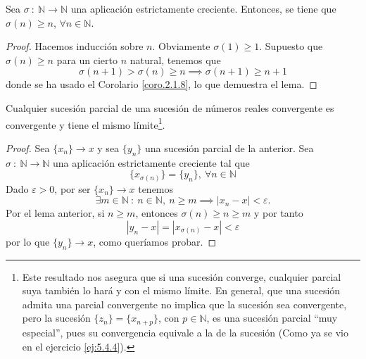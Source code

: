 \begin{lema}
    Sea $\sigma ~:~ \mathbb{N} \longrightarrow \mathbb{N}$ una aplicación estrictamente creciente. Entonces, se tiene que $\sigma(n) \geq n$, $\forall n \in \mathbb{N}$.
\end{lema}
\begin{proof}
    Hacemos inducción sobre $n$. Obviamente $\sigma(1) \geq 1$. Supuesto que $\sigma(n) \geq n$ para un cierto $n$ natural, tenemos que
    \begin{equation*}
        \sigma(n+1) > \sigma(n) \geq n \implies \sigma(n+1) \geq n+1
    \end{equation*}
    donde se ha usado el Corolario \ref{coro.2.1.8}, lo que demuestra el lema.
\end{proof}

\begin{prop}
    Cualquier sucesión parcial de una sucesión de números reales convergente es convergente y tiene el mismo límite\footnote{Este resultado nos asegura que si una sucesión converge, cualquier parcial suya también lo hará y con el mismo límite. En general, que una sucesión admita una parcial convergente no implica que la sucesión sea convergente, pero la sucesión $\{z_n\} = \{x_{n+p}\}$, con $p \in \mathbb{N}$, es una sucesión parcial ``muy especial'', pues su convergencia equivale a la de la sucesión (Como ya se vio en el ejercicio \ref{ej:5.4.4}).}.
\end{prop}
\begin{proof}
    Sea $\{x_n\} \longrightarrow x$ y sea $\{y_n\}$ una sucesión parcial de la anterior. Sea $\sigma ~:~ \mathbb{N} \longrightarrow \mathbb{N}$ una aplicación estrictamente creciente tal que
    \begin{equation*}
        \{x_{\sigma(n)}\} = \{y_n\}, ~ \forall n \in \mathbb{N}
    \end{equation*}
    Dado $\varepsilon > 0$, por ser $\{x_n\} \longrightarrow x$ tenemos
    \begin{equation*}
        \exists m \in \mathbb{N}  ~:~ n \in \mathbb{N}, ~n \geq m \implies |x_n - x| < \varepsilon.
    \end{equation*}
    Por el lema anterior, si $n \geq m$, entonces $\sigma(n) \geq n \geq m$ y por tanto
    \begin{equation*}
        |y_n - x| = |x_{\sigma(n)} - x| < \varepsilon
    \end{equation*}
    por lo que $\{y_n\} \longrightarrow x$, como queríamos probar.
\end{proof}

